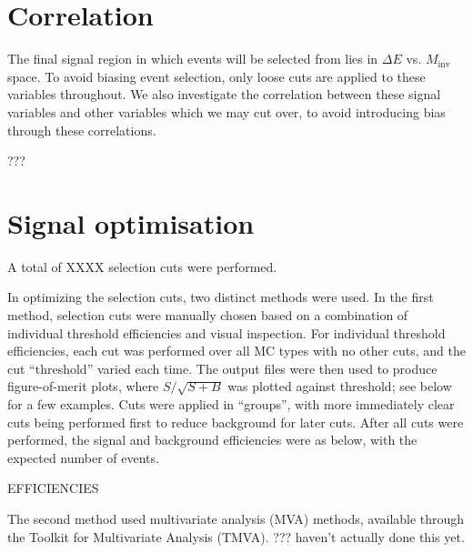 \documentclass[12pt]{thesis}  %
\begin{document}
\pagebreak


\chapter{Correlation}

The final signal region in which events will be selected from lies in $\Delta E$ vs. $M_{\text{inv}}$ space. To avoid biasing event selection, only loose cuts are applied to these variables throughout. We also investigate the correlation between these signal variables and other variables which we may cut over, to avoid introducing bias through these correlations. 

???

\pagebreak


\chapter{Signal optimisation}

A total of XXXX selection cuts were performed.

In optimizing the selection cuts, two distinct methods were used. In the first method, selection cuts were manually chosen based on a combination of individual threshold efficiencies and visual inspection. For individual threshold efficiencies, each cut was performed over all MC types with no other cuts, and the cut ``threshold'' varied each time. The output files were then used to produce figure-of-merit plots, where $S/\sqrt{S+B}$ was plotted against threshold; see below for a few examples. Cuts were applied in ``groups'', with more immediately clear cuts being performed first to reduce background for later cuts. After all cuts were performed, the signal and background efficiencies were as below, with the expected number of events.

EFFICIENCIES

The second method used multivariate analysis (MVA) methods, available through the Toolkit for Multivariate Analysis (TMVA). ??? haven't actually done this yet.

\pagebreak
\end{document}
